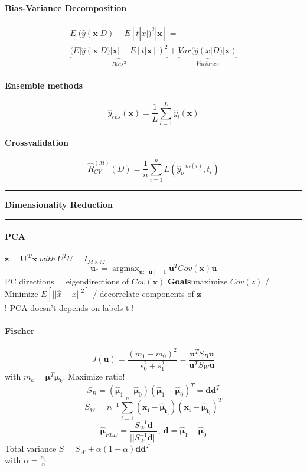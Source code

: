 \documentclass[7pt]{scrartcl}
\newlength{\secskip}
\renewcommand{\section}[1]{
  \vspace{\secskip}
  \hrule\vspace{.3em}
  \textbf{#1}
  \vspace{.3em}
  \hrule
  \vspace{\secskip}
}
\DeclareMathOperator*{\argmax}{argmax}
\renewcommand{\vec}{\mathbf}
\begin{document}
\begin{multicols}{4}
\paragraph{Bias-Variance Decomposition}
\begin{align*}
E[(\hat{y}(\vec{x}|D) - E[t|x])^2|\vec x] = \\ \underbrace{(E[\hat{y}(\vec{x}|D)|\vec{x}] - E[t|\vec{x}])^2}_{Bias^2} + \underbrace{Var(\hat{y}(x|D) | \vec{x})}_{Variance}
\end{align*}
\paragraph{Ensemble methods}
\[\hat{y}_{ens}(\vec{x}) = \frac{1}{L} \sum_{l=1}^L \hat{y}_l(\vec{x})\]
\paragraph{Crossvalidation}
\[\hat{R}_{CV}^{(M)}(D) = \frac{1}{n}\sum_{i=1}^n L(\hat{y}_\nu^{-m(i)},t_i)\]

\section{Dimensionality Reduction}
\paragraph{PCA}
$\vec{z = U^T x} ~with~ U^TU=I_{M \times M}$
\[\vec{u}_* = \argmax_{\vec{u}:||\vec{u}||=1} \vec{u}^T Cov(\vec{x}) \vec{u}\]
PC directions = eigendirections of $Cov(\vec{x})$
\textbf{Goals}:maximize $Cov(z)$ / Minimize $E[||\hat{x}-x||^2]$ / decorrelate components of $\vec{z}$ \\
! PCA doesn't depends on labels t !
\paragraph{Fischer}
\[J(\vec{u}) = \frac{(m_1 - m_0)^2}{s_0^2 + s_1^2} = \frac{\vec{u}^T S_B \vec{u}}{\vec{u}^T S_W \vec{u}}\]
with $m_k = \vec{\mu}^T \vec{\mu}_k$. Maximize ratio!
\[S_B = (\hat{\vec{\mu}}_1 -\hat{\vec{\mu}}_0)(\hat{\vec{\mu}}_1 -\hat{\vec{\mu}}_0)^T = \vec d \vec d^T\]
\[S_W = n^{-1} \sum_{i=1}^n(\vec{x_i} - \vec{\hat{\mu}_{t_i}})(\vec{x_i} - \vec{\hat{\mu}_{t_i}})^T\]
\[\vec{\hat{\mu}}_{FLD} = \frac{S_W^{-1} \vec{d}}{||S_W^{-1} \vec{d}||}, ~ \vec{d} = \hat{\vec{\mu}}_1 -\hat{\vec{\mu}}_0\]
Total variance $S=S_W + \alpha(1-\alpha)\vec d \vec d^T$\\with $ \alpha = \frac{n_1}{n}$

\end{multicols}
\end{document}
